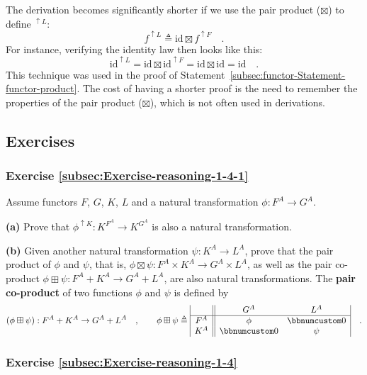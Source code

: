 The derivation becomes significantly shorter if we use the pair product
($\boxtimes$) to define $^{\uparrow L}$:
\[
f^{\uparrow L}\triangleq\text{id}\boxtimes f^{\uparrow F}\quad.
\]
For instance, verifying the identity law then looks like this:
\[
\text{id}^{\uparrow L}=\text{id}\boxtimes\text{id}^{\uparrow F}=\text{id}\boxtimes\text{id}=\text{id}\quad.
\]
This technique was used in the proof of Statement~\ref{subsec:functor-Statement-functor-product}.
The cost of having a shorter proof is the need to remember the properties
of the pair product ($\boxtimes$), which is not often used in derivations.

\subsection{Exercises}

\subsubsection{Exercise \label{subsec:Exercise-reasoning-1-4-1}\ref{subsec:Exercise-reasoning-1-4-1}}

Assume functors $F$, $G$, $K$, $L$ and a natural transformation
$\phi:F^{A}\rightarrow G^{A}$.

\textbf{(a)} Prove that $\phi^{\uparrow K}:K^{F^{A}}\rightarrow K^{G^{A}}$
is also a natural transformation.

\textbf{(b)} Given another natural transformation $\psi:K^{A}\rightarrow L^{A}$,
prove that the pair product of $\phi$ and $\psi$, that is, $\phi\boxtimes\psi:F^{A}\times K^{A}\rightarrow G^{A}\times L^{A}$,
as well as the pair co-product $\phi\boxplus\psi:F^{A}+K^{A}\rightarrow G^{A}+L^{A}$,
are also natural transformations. The \textbf{pair co-product}
of two functions $\phi$ and $\psi$ is defined by
\[
(\phi\boxplus\psi):F^{A}+K^{A}\rightarrow G^{A}+L^{A}\quad,\quad\quad\phi\boxplus\psi\triangleq\begin{array}{|c||cc|}
 & G^{A} & L^{A}\\
\hline F^{A} & \phi & \bbnum 0\\
K^{A} & \bbnum 0 & \psi
\end{array}\quad.
\]


\subsubsection{Exercise \label{subsec:Exercise-reasoning-1-4}\ref{subsec:Exercise-reasoning-1-4}}

